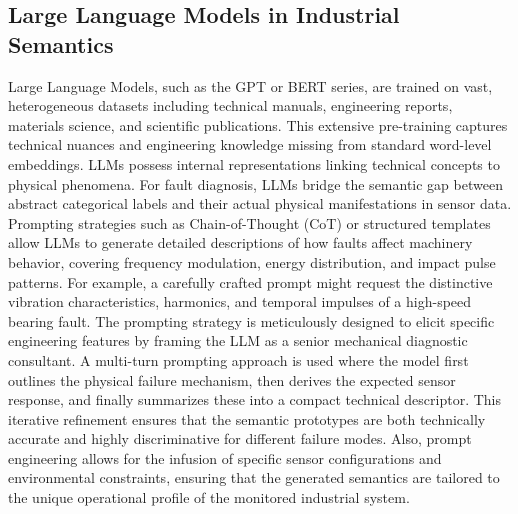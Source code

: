 \subsection{Large Language Models in Industrial Semantics}
Large Language Models, such as the GPT or BERT series, are trained on vast, heterogeneous datasets including technical manuals, engineering reports, materials science, and scientific publications. This extensive pre-training captures technical nuances and engineering knowledge missing from standard word-level embeddings. LLMs possess internal representations linking technical concepts to physical phenomena. For fault diagnosis, LLMs bridge the semantic gap between abstract categorical labels and their actual physical manifestations in sensor data. Prompting strategies such as Chain-of-Thought (CoT) or structured templates allow LLMs to generate detailed descriptions of how faults affect machinery behavior, covering frequency modulation, energy distribution, and impact pulse patterns. For example, a carefully crafted prompt might request the distinctive vibration characteristics, harmonics, and temporal impulses of a high-speed bearing fault. The prompting strategy is meticulously designed to elicit specific engineering features by framing the LLM as a senior mechanical diagnostic consultant. A multi-turn prompting approach is used where the model first outlines the physical failure mechanism, then derives the expected sensor response, and finally summarizes these into a compact technical descriptor. This iterative refinement ensures that the semantic prototypes are both technically accurate and highly discriminative for different failure modes. Also, prompt engineering allows for the infusion of specific sensor configurations and environmental constraints, ensuring that the generated semantics are tailored to the unique operational profile of the monitored industrial system.

